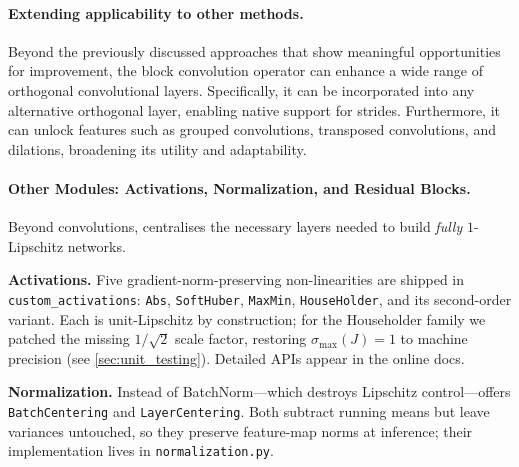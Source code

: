     \paragraph{Extending applicability to other methods.} Beyond the previously discussed approaches that show meaningful opportunities for improvement, the block convolution operator can enhance a wide range of orthogonal convolutional layers. Specifically, it can be incorporated into any alternative orthogonal layer, enabling native support for strides. Furthermore, it can unlock features such as grouped convolutions, transposed convolutions, and dilations, broadening its utility and adaptability.


\paragraph{Other Modules: Activations, Normalization, and Residual Blocks.}
Beyond convolutions, \textbf{\Orthogonium} centralises the necessary layers needed to build \emph{fully} $1$-Lipschitz networks.

\textbf{Activations.}  
Five gradient-norm-preserving non-linearities are shipped in \texttt{custom\_activations}: \texttt{Abs}, \texttt{SoftHuber}, \texttt{MaxMin}, \texttt{HouseHolder}, and its second-order variant.  Each is unit-Lipschitz by construction; for the Householder family we patched the missing $1/\!\sqrt{2}$ scale factor, restoring $\sigma_{\max}(J)=1$ to machine precision (see \cref{sec:unit_testing}).  Detailed APIs appear in the online docs.

\textbf{Normalization.}  
Instead of BatchNorm—which destroys Lipschitz control—\Orthogonium offers \texttt{BatchCentering} and \texttt{LayerCentering}.  
Both subtract running means but leave variances untouched, so they preserve feature-map norms at inference; their implementation lives in \texttt{normalization.py}.


